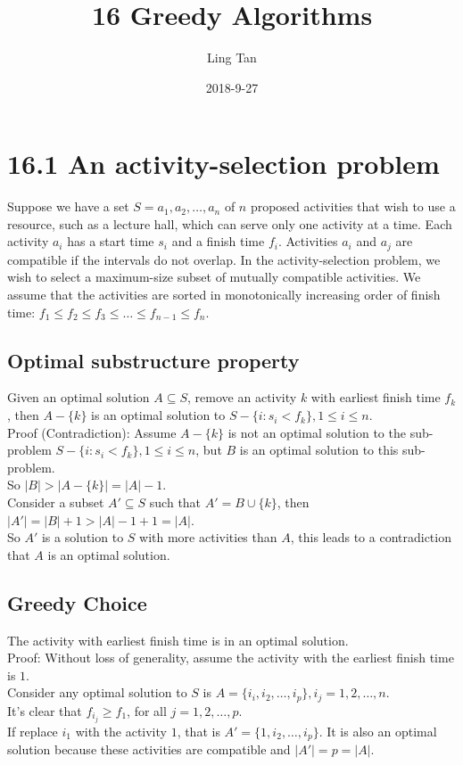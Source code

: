 \documentclass[a4paper]{article}
\title{16 Greedy Algorithms}
\author{Ling Tan}
\date{2018-9-27}
\begin{document}
\maketitle

\section*{16.1 An activity-selection problem}
Suppose we have a set $S={a_1,a_2, \dots, a_n}$ of $n$ proposed activities that wish to use a resource, such as a lecture hall, which can serve only one activity at a time. Each activity $a_i$ has a start time $s_i $ and a finish time $f_i$. Activities $a_i$ and $a_j$ are compatible if the intervals do not overlap. In the activity-selection problem, we wish to select a \color{red}maximum-size \color{black} subset of mutually compatible activities. We assume that the activities are sorted in monotonically increasing order of finish time: $f_1\leq f_2 \leq f_3 \leq \dots \leq f_{n-1} \leq f_n$.
\subsection*{Optimal substructure property}
Given an optimal solution $A\subseteq S$, remove an activity $k$ with earliest finish time $f_k$, then $A-\{k\}$ is an optimal solution to $S-\{i:s_i < f_k\}, 1\leq i\leq n$.\\
Proof (Contradiction): Assume $A-\{k\}$ is not an optimal solution to the sub-problem $S-\{i:s_i < f_k\}, 1\leq i\leq n$, but $B$ is an optimal solution to this sub-problem.\\
So $|B|>|A-\{k\}|=|A|-1$.\\
Consider a subset $A'\subseteq S$ such that $A'=B\cup \{k\}$, then $|A'|=|B|+1>|A|-1+1=|A|$.\\
So $A'$ is a solution to $S$ with more activities than $A$, this leads to a contradiction that $A$ is an optimal solution. 

\subsection*{Greedy Choice}
The activity with earliest finish time is in an optimal solution.\\
Proof: Without loss of generality, assume the activity with the earliest finish time is $1$.\\
Consider any optimal solution to $S$ is $A=\{i_i, i_2,\dots, i_p\}, i_j =1,2,\dots, n$.\\
It's clear that $f_{i_j} \geq f_1$, for all $j=1,2,\dots,p$.\\
If replace $i_1$ with the activity $1$, that is $A'= \{1, i_2, \dots, i_p\}$. It is also an optimal solution because these activities are compatible and $|A'|=p=|A|$.
\end{document}
